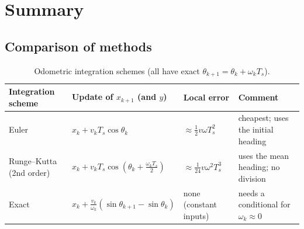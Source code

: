 \documentclass[11pt,a4paper]{article}
\newcommand{\Ts}{T_s}
\theoremstyle{plain}
\theoremstyle{definition}
\theoremstyle{remark}
\begin{document}
\section{Summary}

\subsection{Comparison of methods}

\begin{table}[htbp]
\centering
\small
\renewcommand{\arraystretch}{1.25}
\begin{tabularx}{\textwidth}{@{}l>{\raggedright\arraybackslash}X>{\raggedright\arraybackslash}X>{\raggedright\arraybackslash}X@{}}
\toprule
\textbf{Integration scheme} & \textbf{Update of $x_{k+1}$ (and $y$)} & \textbf{Local error} & \textbf{Comment}\\
\midrule
Euler & $x_k+v_k\Ts\cos\theta_k$ & $\approx\tfrac12v\omega\Ts^2$ & cheapest; uses the initial heading\\
Runge--Kutta (2nd order) & $x_k+v_k\Ts\cos(\theta_k+\tfrac{\omega_k\Ts}2)$ & $\approx\tfrac1{24}v\omega^2\Ts^3$ & uses the mean heading; no division\\
Exact & $x_k+\tfrac{v_k}{\omega_k}(\sin\theta_{k+1}-\sin\theta_k)$ & none (constant inputs) & needs a conditional for $\omega_k\approx0$\\
\bottomrule
\end{tabularx}
\caption{Odometric integration schemes (all have exact $\theta_{k+1}=\theta_k+\omega_k\Ts$).}
\end{table}
\end{document}
